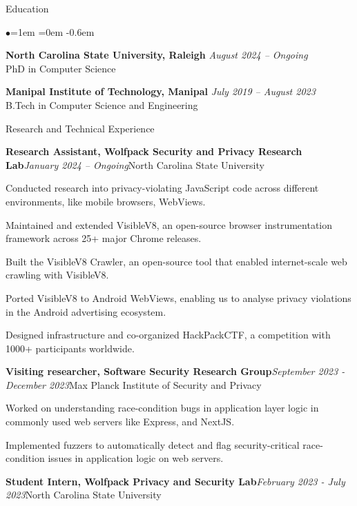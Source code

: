 \documentclass{resume} %
\date{\today}
\begin{document}
\vspace{-1em}
\begin{rSection}{Education}
\begin{list}{$\bullet$}{\leftmargin=1em \itemindent=0em}
\itemsep -0.6em
\item {\bf North Carolina State University, Raleigh} \hfill {\em August 2024 -- Ongoing}  \\ PhD in Computer Science\hfill
\item {\bf Manipal Institute of Technology, Manipal} \hfill {\em July 2019 -- August 2023}  \\ B.Tech in Computer Science and Engineering\hfill
\end{list}
\end{rSection}
\printbibliography[heading=none]
\begin{rSection}{Research and Technical Experience}
\begin{rSubsection}{\bf Research Assistant, Wolfpack Security and Privacy Research Lab}{\em January 2024 -- Ongoing}{North Carolina State University}{}
\item Conducted research into privacy-violating JavaScript code across different environments, like mobile browsers, WebViews.
\item Maintained and extended VisibleV8, an open-source browser instrumentation framework across 25+ major Chrome releases.
\item Built the VisibleV8 Crawler, an open-source tool that enabled internet-scale web crawling with VisibleV8.
\item Ported VisibleV8 to Android WebViews, enabling us to analyse privacy violations in the Android advertising ecosystem.
\item Designed infrastructure and co-organized HackPackCTF, a competition with 1000+ participants worldwide.
\end{rSubsection}
\begin{rSubsection}{\bf Visiting researcher, Software Security Research Group}{\em September 2023 - December 2023}{Max Planck Institute of Security and Privacy}{}
\item Worked on understanding race-condition bugs in application layer logic in commonly used web servers like Express, and NextJS.
\item Implemented fuzzers to automatically detect and flag security-critical race-condition issues in application logic on web servers.
\end{rSubsection}
\begin{rSubsection}{\bf Student Intern, Wolfpack Privacy and Security Lab}{\em February 2023 - July 2023}{North Carolina State University}{}

\end{rSubsection}
\end{rSection}
\end{document}

